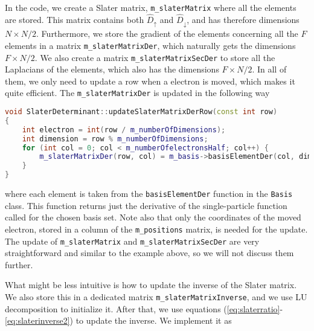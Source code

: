 In the code, we create a Slater matrix, \lstinline{m_slaterMatrix} where all the elements are stored. This matrix contains both $\hat{D}_{\uparrow}$ and $\hat{D}_{\downarrow}$, and has therefore dimensions $N\times N/2$. Furthermore, we store the gradient of the elements concerning all the $F$ elements in a matrix \lstinline{m_slaterMatrixDer}, which naturally gets the dimensions $F\times N/2$. We also create a matrix \lstinline{m_slaterMatrixSecDer} to store all the Laplacians of the elements, which also has the dimensions $F\times N/2$. In all of them, we only need to update a row when a electron is moved, which makes it quite efficient. The \lstinline{m_slaterMatrixDer} is updated in the following way

\begin{lstlisting}[language={c++}]
void SlaterDeterminant::updateSlaterMatrixDerRow(const int row)
{
	int electron = int(row / m_numberOfDimensions);
	int dimension = row % m_numberOfDimensions;
	for (int col = 0; col < m_numberOfelectronsHalf; col++) {
		m_slaterMatrixDer(row, col) = m_basis->basisElementDer(col, dimension, m_positions.col(electron));
	}
}
\end{lstlisting}
where each element is taken from the \lstinline{basisElementDer} function in the \lstinline{Basis} class. This function returns just the derivative of the single-particle function called for the chosen basis set. Note also that only the coordinates of the moved electron, stored in a column of the \lstinline{m_positions} matrix, is needed for the update. The update of \lstinline{m_slaterMatrix} and \lstinline{m_slaterMatrixSecDer} are very straightforward and similar to the example above, so we will not discuss them further.

What might be less intuitive is how to update the inverse of the Slater matrix. We also store this in a dedicated matrix \lstinline{m_slaterMatrixInverse}, and we use LU decomposition to initialize it. After that, we use equations (\ref{eq:slaterratio}-\ref{eq:slaterinverse2}) to update the inverse. We implement it as

